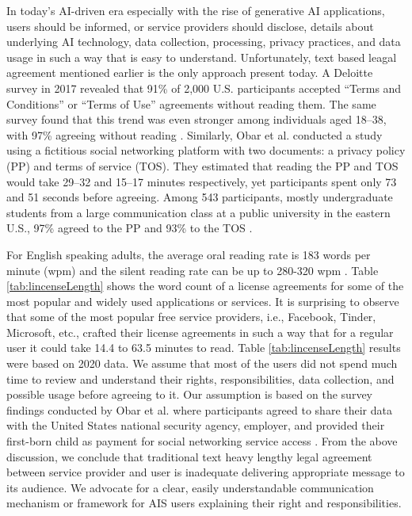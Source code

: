 \documentclass[manuscript,screen,review]{acmart}
\begin{document}
	In today’s AI-driven era especially with the rise of generative AI applications, users should be informed, or service providers should disclose, details about underlying AI technology, data collection, processing, privacy practices, and data usage in such a way that is easy to understand. Unfortunately, text based leagal agreement mentioned earlier is the only approach present today. A Deloitte survey in 2017 revealed that 91\% of 2,000 U.S. participants accepted “Terms and Conditions” or “Terms of Use” agreements without reading them. The same survey found that this trend was even stronger among individuals aged 18–38, with 97\% agreeing without reading \cite{cakebread_youre_2014}. Similarly, Obar et al. conducted a study using a fictitious social networking platform with two documents: a privacy policy (PP) and terms of service (TOS). They estimated that reading the PP and TOS would take 29–32 and 15–17 minutes respectively, yet participants spent only 73 and 51 seconds before agreeing. Among 543 participants, mostly undergraduate students from a large communication class at a public university in the eastern U.S., 97\% agreed to the PP and 93\% to the TOS \cite{obar_biggest_2016}. 
	
	
	For English speaking adults, the average oral reading rate is 183 words per minute (wpm) and the silent reading rate can be up to 280-320 wpm \cite{obar_biggest_2016}\cite{brysbaert_how_2019}. Table \ref{tab:lincenseLength} shows the word count of a license agreements for some of the most popular and widely used applications or services. It is surprising to observe that some of the most popular free service providers, i.e., Facebook, Tinder, Microsoft, etc., crafted their license agreements in such a way that for a regular user it could take 14.4 to 63.5 minutes to read. Table \ref{tab:lincenseLength} results were based on 2020 data. We assume that most of the users did not spend much time to review and understand their rights, responsibilities, data collection, and possible usage before agreeing to it. Our assumption is based on the survey findings conducted by Obar et al. where participants agreed to share their data with the United States national security agency, employer, and provided their first-born child as payment for social networking service access \cite{obar_biggest_2016}. From the above discussion, we conclude that traditional text heavy lengthy legal agreement between service provider and user is inadequate delivering appropriate message to its audience. We advocate for a clear, easily understandable communication mechanism or framework for AIS users explaining their right and responsibilities.  
	
\end{document}
